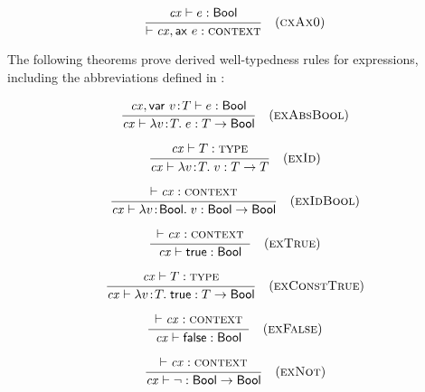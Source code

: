 \begin{theorem}\label{thm-axmono}
{\rm
\[
\rruleI
 {\hastyO{\expr}{\bool}}
 {\cxwf{\snoc{\cx}{\axM{\expr}}}}
 {\Rcxaxmono}
\]
}
\end{theorem}

The following theorems prove derived well-typedness rules for expressions,
including the abbreviations defined in :

\begin{theorem}\label{thm-eabsbool}
{\rm
\[
\rruleI
 {\hasty{\cx,\vdecO}{\expr}{\bool}}
 {\hastyO{\absO}{\tarr{\typ}{\bool}}}
 {\Reabsbool}
\]
}
\end{theorem}

\begin{theorem}\label{thm-eid}
{\rm
\[
\rruleI
 {\istyO{\typ}}
 {\hastyO{\abs{\var}{\typ}{\var}}{\tarr{\typ}{\typ}}}
 {\Reid}
\]
}
\end{theorem}

\begin{theorem}\label{thm-eidbool}
{\rm
\[
\rruleI
 {\cxwfO}
 {\hastyO{\abs{\var}{\bool}{\var}}{\tarr{\bool}{\bool}}}
 {\Reidbool}
\]
}
\end{theorem}

\begin{theorem}\label{thm-etrue}
{\rm
\[
\rruleI
 {\cxwfO}
 {\hastyO{\true}{\bool}}
 {\Retrue}
\]
}
\end{theorem}

\begin{theorem}\label{thm-econsttrue}
{\rm
\[
\rruleI
 {\istyO{\typ}}
 {\hastyO{\abs{\var}{\typ}{\true}}{\tarr{\typ}{\bool}}}
 {\Reconsttrue}
\]
}
\end{theorem}

\begin{theorem}\label{thm-efalse}
{\rm
\[
\rruleI
 {\cxwfO}
 {\hastyO{\false}{\bool}}
 {\Refalse}
\]
}
\end{theorem}

\begin{theorem}\label{thm-enot}
{\rm
\[
\rruleI
 {\cxwfO}
 {\hastyO{\negaop}{\tarr{\bool}{\bool}}}
 {\Renot}
\]
}
\end{theorem}

